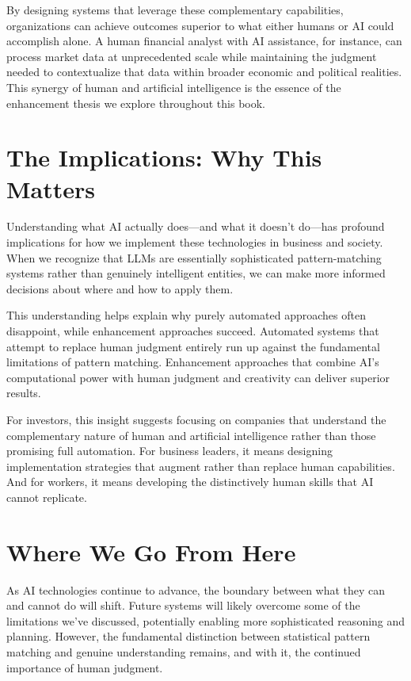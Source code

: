 \documentclass[
  Letterpaper,
]{scrbook}
\begin{document}
By designing systems that leverage these complementary capabilities,
organizations can achieve outcomes superior to what either humans or AI
could accomplish alone. A human financial analyst with AI assistance,
for instance, can process market data at unprecedented scale while
maintaining the judgment needed to contextualize that data within
broader economic and political realities. This synergy of human and
artificial intelligence is the essence of the
enhancement thesis we explore
throughout this book.

\section{The Implications: Why This
Matters}\label{the-implications-why-this-matters}

Understanding what AI actually does---and what it doesn't do---has
profound implications for how we implement these technologies in
business and society. When we recognize that LLMs are essentially
sophisticated pattern-matching systems rather than genuinely intelligent
entities, we can make more informed decisions about where and how to
apply them.

This understanding helps explain why purely automated approaches often
disappoint, while enhancement approaches succeed. Automated systems that
attempt to replace human judgment entirely run up against the
fundamental limitations of pattern matching. Enhancement approaches that
combine AI's computational power with human judgment and creativity can
deliver superior results.

For investors, this insight suggests focusing on companies that
understand the complementary nature of human and artificial intelligence
rather than those promising full
automation. For business leaders, it means
designing implementation strategies that augment rather than replace
human capabilities. And
for workers, it means developing the distinctively human skills that AI
cannot replicate.

\section{Where We Go From Here}\label{where-we-go-from-here}

As AI technologies continue to advance, the boundary between what they
can and cannot do will shift. Future systems will likely overcome some
of the limitations we've discussed, potentially enabling more
sophisticated reasoning and planning. However, the fundamental
distinction between statistical pattern matching and genuine
understanding remains, and with it, the continued importance of human
judgment.
\end{document}
